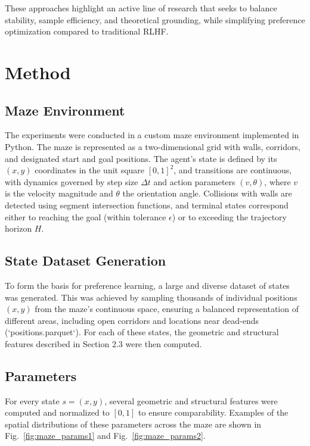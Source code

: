 \documentclass[a4paper,oneside,10pt,ngerman,english]{scrartcl}
\begin{document}
These approaches highlight an active line of research that seeks to balance stability, sample efficiency, and theoretical grounding, while simplifying preference optimization compared to traditional RLHF.



\section{Method}
\label{sec:method}

\subsection{Maze Environment}

The experiments were conducted in a custom maze environment implemented in Python. 
The maze is represented as a two-dimensional grid with walls, corridors, and designated start and goal positions. 
The agent’s state is defined by its $(x, y)$ coordinates in the unit square $[0,1]^2$, and transitions are continuous, 
with dynamics governed by step size $\Delta t$ and action parameters $(v, \theta)$, where $v$ is the velocity magnitude and $\theta$ the orientation angle. 
Collisions with walls are detected using segment intersection functions, and terminal states correspond either to reaching the goal (within tolerance $\epsilon$) or to exceeding the trajectory horizon $H$.

\subsection{State Dataset Generation}
To form the basis for preference learning, a large and diverse dataset of states was generated. This was achieved by sampling thousands of individual positions $(x,y)$ from the maze's continuous space, ensuring a balanced representation of different areas, including open corridors and locations near dead-ends (`positions.parquet`). For each of these states, the geometric and structural features described in Section 2.3 were then computed.

\subsection{Parameters}

For every state $s = (x, y)$, several geometric and structural features were computed and normalized to $[0,1]$ to ensure comparability. 
Examples of the spatial distributions of these parameters across the maze are shown in Fig.~\ref{fig:maze_params1} and Fig.~\ref{fig:maze_params2}.
\end{document}
